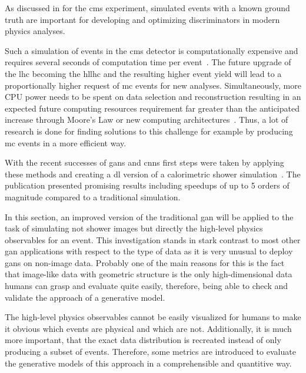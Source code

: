 
\label{sec:mcwgan}

As discussed in  for the \gls{cms} experiment, simulated events with a known ground truth are important for developing and optimizing discriminators in modern physics analyses.

Such a simulation of events in the \gls{cms} detector is computationally expensive and requires several seconds of computation time per event~\cite{cms-fastsim}. The future upgrade of the \gls{lhc} becoming the \gls{hllhc} and the resulting higher event yield will lead to a proportionally higher request of \gls{mc} events for new analyses. Simultaneously, more CPU power needs to be spent on data selection and reconstruction resulting in an expected future computing resources requirement far greater than the anticipated increase through Moore's Law or new computing architectures~\cite{computingchallenges}. Thus, a lot of research is done for finding solutions to this challenge for example by producing \gls{mc} events in a more efficient way.

With the recent successes of \glspl{gan} and \glspl{cnn} first steps were taken by applying these methods and creating a \gls{dl} version of a calorimetric shower simulation~\cite{calogan}. The publication presented promising results including speedups of up to 5 orders of magnitude compared to a traditional \geant{} simulation.

In this section, an improved version of the traditional \gls{gan} will be applied to the task of simulating not shower images but directly the high-level physics observables for an event. This investigation stands in stark contrast to most other \gls{gan} applications with respect to the type of data as it is very unusual to deploy \glspl{gan} on non-image data. Probably one of the main reasons for this is the fact that image-like data with geometric structure is the only high-dimensional data humans can grasp and evaluate quite easily, therefore, being able to check and validate the approach of a generative model.

The high-level physics observables cannot be easily visualized for humans to make it obvious which events are physical and which are not. Additionally, it is much more important, that the exact data distribution is recreated instead of only producing a subset of events. Therefore, some metrics are introduced to evaluate the generative models of this approach in a comprehensible and quantitive way.

